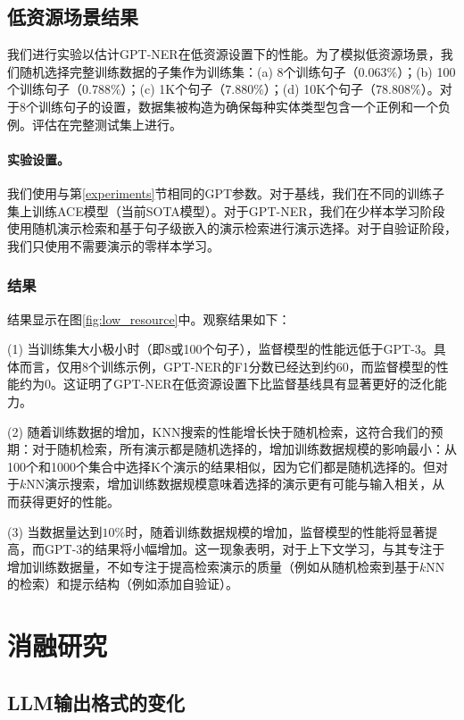 \documentclass[supercite]{Experimental_Report}
\theoremstyle{definition}
\begin{document}
\subsection{低资源场景结果}

我们进行实验以估计GPT-NER在低资源设置下的性能。为了模拟低资源场景，我们随机选择完整训练数据的子集作为训练集：(a) 8个训练句子（$0.063\%$）；(b) 100个训练句子（$0.788\%$）；(c) 1K个句子（$7.880\%$）；(d) 10K个句子（$78.808\%$）。对于8个训练句子的设置，数据集被构造为确保每种实体类型包含一个正例和一个负例。评估在完整测试集上进行。

\paragraph{实验设置。}
我们使用与第\ref{experiments}节相同的GPT参数。对于基线，我们在不同的训练子集上训练ACE模型\cite{wang2020automated}（当前SOTA模型）。对于GPT-NER，我们在少样本学习阶段使用随机演示检索和基于句子级嵌入的演示检索进行演示选择。对于自验证阶段，我们只使用不需要演示的零样本学习。

\subsubsection{结果}
结果显示在图\ref{fig:low_resource}中。观察结果如下：

(1) 当训练集大小极小时（即8或100个句子），监督模型的性能远低于GPT-3。具体而言，仅用8个训练示例，GPT-NER的F1分数已经达到约60，而监督模型的性能约为0。这证明了GPT-NER在低资源设置下比监督基线具有显著更好的泛化能力。

(2) 随着训练数据的增加，KNN搜索的性能增长快于随机检索，这符合我们的预期：对于随机检索，所有演示都是随机选择的，增加训练数据规模的影响最小：从100个和1000个集合中选择K个演示的结果相似，因为它们都是随机选择的。但对于$k$NN演示搜索，增加训练数据规模意味着选择的演示更有可能与输入相关，从而获得更好的性能。

(3) 当数据量达到$10\%$时，随着训练数据规模的增加，监督模型的性能将显著提高，而GPT-3的结果将小幅增加。这一现象表明，对于上下文学习，与其专注于增加训练数据量，不如专注于提高检索演示的质量（例如从随机检索到基于$k$NN的检索）和提示结构（例如添加自验证）。

\section{消融研究}

\subsection{LLM输出格式的变化}
\label{analysis_output_format}
\end{document}
